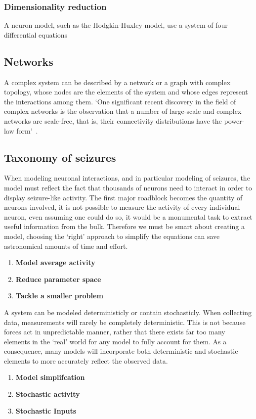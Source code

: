 \documentclass[../../Orator.tex]{subfiles}
\begin{document}
\subsubsection{Dimensionality reduction}
A neuron model, such as the Hodgkin-Huxley model, use a system of four differential equations

\subsection*{Networks}
A complex system can be described by a network or a graph with complex topology, whose nodes are the elements of the system and whose edges represent the interactions among them. `One significant recent discovery in the field of complex networks is the observation that a number of
large-scale and complex networks are scale-free, that is, their connectivity distributions have the
power-law form'~\cite{wang2002synchronization}.




\subsection*{Taxonomy of seizures}


When modeling neuronal interactions, and in particular modeling of seizures, the model must reflect the fact that thousands of neurons need to interact in order to display seizure-like activity. 
The first major roadblock becomes the quantity of neurons involved, it is not possible to measure the activity of every individual neuron, even assuming one could do so, it would be a monumental task to extract useful information from the bulk. 
Therefore we must be smart about creating a model, choosing the `right' approach to simplify the equations can save astronomical amounts of time and effort.
\begin{enumerate}
    \item \textbf{Model average activity}
    \item \textbf{Reduce parameter space}
    \item \textbf{Tackle a smaller problem}
\end{enumerate}


A system can be modeled deterministicly or contain stochasticly. When collecting data, measurements will rarely be completely deterministic. This is not because forces act in unpredictable manner, rather that there exists far too many elements in the `real' world for any model to fully account for them. 
As a consequence, many models will incorporate both deterministic and stochastic elements to more accurately reflect the observed data.
\begin{enumerate}
    \item \textbf{Model simplifcation}
    \item \textbf{Stochastic activity}
    \item \textbf{Stochastic Inputs}
\end{enumerate}
\end{document}
